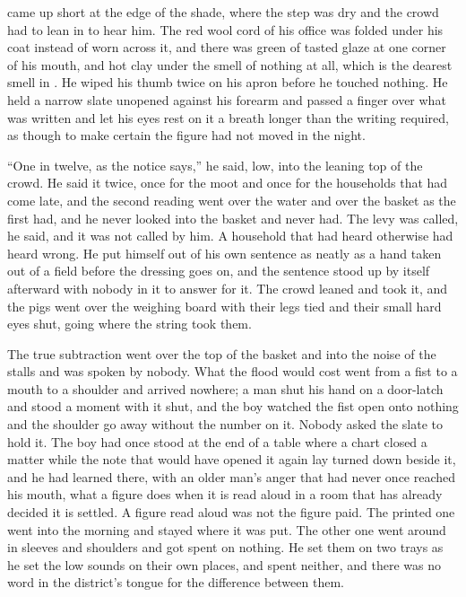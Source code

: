  came up short at the edge of the shade, where the step was dry and the crowd had to lean in to hear him. The red wool cord of his office was folded under his coat instead of worn across it, and there was green of tasted glaze at one corner of his mouth, and hot clay under the smell of nothing at all, which is the dearest smell in . He wiped his thumb twice on his apron before he touched nothing. He held a narrow slate unopened against his forearm and passed a finger over what was written and let his eyes rest on it a breath longer than the writing required, as though to make certain the figure had not moved in the night.

“One in twelve, as the notice says,” he said, low, into the leaning top of the crowd. He said it twice, once for the moot and once for the households that had come late, and the second reading went over the water and over the basket as the first had, and he never looked into the basket and never had. The levy was called, he said, and it was not called by him. A household that had heard otherwise had heard wrong. He put himself out of his own sentence as neatly as a hand taken out of a field before the dressing goes on, and the sentence stood up by itself afterward with nobody in it to answer for it. The crowd leaned and took it, and the pigs went over the weighing board with their legs tied and their small hard eyes shut, going where the string took them.

The true subtraction went over the top of the basket and into the noise of the stalls and was spoken by nobody. What the flood would cost went from a fist to a mouth to a shoulder and arrived nowhere; a man shut his hand on a door-latch and stood a moment with it shut, and the boy watched the fist open onto nothing and the shoulder go away without the number on it. Nobody asked the slate to hold it. The boy had once stood at the end of a table where a chart closed a matter while the note that would have opened it again lay turned down beside it, and he had learned there, with an older man's anger that had never once reached his mouth, what a figure does when it is read aloud in a room that has already decided it is settled. A figure read aloud was not the figure paid. The printed one went into the morning and stayed where it was put. The other one went around in sleeves and shoulders and got spent on nothing. He set them on two trays as he set the low sounds on their own places, and spent neither, and there was no word in the district's tongue for the difference between them.


